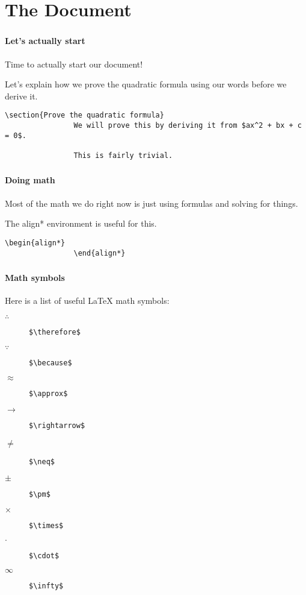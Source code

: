 \documentclass{beamer}
\begin{document}
	\section{The Document}
	\begin{frame}[fragile]
		\frametitle{\secname}
		\framesubtitle{Let's actually start}
		Time to actually start our document!

		Let's explain how we prove the quadratic formula using our words before we derive it.
		\begin{example}
			\begin{lstlisting}[numbers=none, gobble=16]
				\section{Prove the quadratic formula}
				We will prove this by deriving it from $ax^2 + bx + c = 0$.

				This is fairly trivial.
			\end{lstlisting}
		\end{example}
	\end{frame}
	\begin{frame}[fragile]
		\frametitle{\secname}
		\framesubtitle{Doing math}
		Most of the math we do right now is just using formulas and solving for things.

		The \alert{align*} environment is useful for this.
		\begin{example}
			\begin{lstlisting}[numbers=none, gobble=16]
				\begin{align*}
				\end{align*}
			\end{lstlisting}
		\end{example}
	\end{frame}
	\begin{frame}[fragile]
		\frametitle{\secname}
		\framesubtitle{Math symbols}
		Here is a list of useful \LaTeX{} math symbols:
		\begin{description}	
			\item[$\therefore$] \lstinline{$\therefore$}
			\item[$\because$] \lstinline{$\because$}
			\item[$\approx$] \lstinline{$\approx$}
			\item[$\rightarrow$] \lstinline{$\rightarrow$}
			\item[$\neq$] \lstinline{$\neq$}
			\item[$\pm$] \lstinline{$\pm$}
			\item[$\times$] \lstinline{$\times$}
			\item[$\cdot$] \lstinline{$\cdot$}
			\item[$\infty$] \lstinline{$\infty$}
		\end{description}	
	\end{frame}
\end{document}
